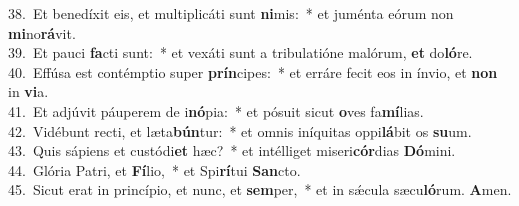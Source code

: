 {38.~}Et benedíxit eis, et multiplicáti sunt \textbf{ni}mis:~* et juménta eórum non \textbf{mi}no\textbf{rá}vit.\\
{39.~}Et pauci \textbf{fa}cti sunt:~* et vexáti sunt a tribulatióne malórum, \textbf{et} do\textbf{ló}re.\\
{40.~}Effúsa est contémptio super \textbf{prín}cipes:~* et erráre fecit eos in ínvio, et \textbf{non} in \textbf{vi}a.\\
{41.~}Et adjúvit páuperem de i\textbf{nó}pia:~* et pósuit sicut \textbf{o}ves fa\textbf{mí}lias.\\
{42.~}Vidébunt recti, et læta\textbf{bún}tur:~* et omnis iníquitas oppi\textbf{lá}bit os \textbf{su}um.\\
{43.~}Quis sápiens et custódi\textbf{et} hæc?~* et intélliget miseri\textbf{cór}dias \textbf{Dó}mini.\\
{44.~}Glória Patri, et \textbf{Fí}lio,~* et Spi\textbf{rí}tui \textbf{San}cto.\\
{45.~}Sicut erat in princípio, et nunc, et \textbf{sem}per,~* et in sǽcula sæcu\textbf{ló}rum. \textbf{A}men.\\
